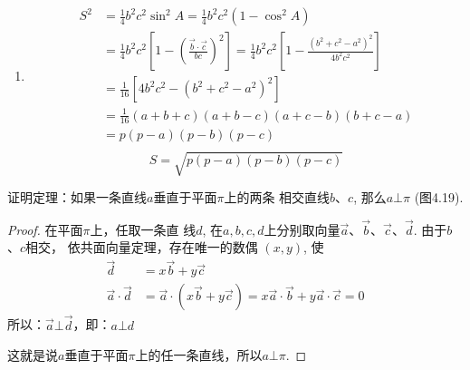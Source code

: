 \begin{solution}
\begin{enumerate}
\item 
\[\begin{split}
    S^{2} &=\frac{1}{4} b^{2} c^{2} \sin ^{2} A=\frac{1}{4} b^{2} c^{2}\left(1-\cos ^{2} A\right) \\
    &=\frac{1}{4} b^{2} c^{2}\left[1-\left(\frac{\vec{b} \cdot \vec{c}}{b c}\right)^{2}\right] =\frac{1}{4} b^{2} c^{2}\left[1-\frac{\left(b^{2}+c^{2}-a^{2}\right)^{2}}{4 b^{2} c^{2}}\right] \\
    &=\frac{1}{16}\left[4 b^{2} c^{2}-\left(b^{2}+c^{2}-a^{2}\right)^{2}\right] \\
    &=\frac{1}{16}(a+b+c)(a+b-c)(a+c-b)(b+c-a) \\
    &=p(p-a)(p-b)(p-c) \\
    \end{split}\]
\[ S=\sqrt{p(p-a)(p-b)(p-c)}\]
\end{enumerate}
\end{solution}

\begin{example}
    证明定理：如果一条直线$a$垂直于平面$\pi$上的两条
相交直线$b$、$c$, 那么$a\bot\pi $ (图4.19).
\end{example}

\begin{proof}
    在平面$\pi$上，任取一条直
线$d$, 在$a,b,c,d$上分别取向量$\vec{a}$、$\vec{b}$、$\vec{c}$、$\vec{d}$. 由于$b$、$c$相交，
依共面向量定理，存在唯一的数偶
$(x,y)$, 使
\[\begin{split}
    \vec{d}&=x\vec{b}+y\vec{c}\\
    \vec{a}\cdot \vec{d}&=\vec{a}\cdot \left(x\vec{b}+y\vec{c}\right)=x\vec{a}\cdot \vec{b}+y\vec{a}\cdot \vec{c}=0
\end{split}\]
所以：$\vec{a}\bot \vec{d}$，即：$a\bot d$

这就是说$a$垂直于平面$\pi$上的任一条直线，所以$a\bot\pi$.
\end{proof}


